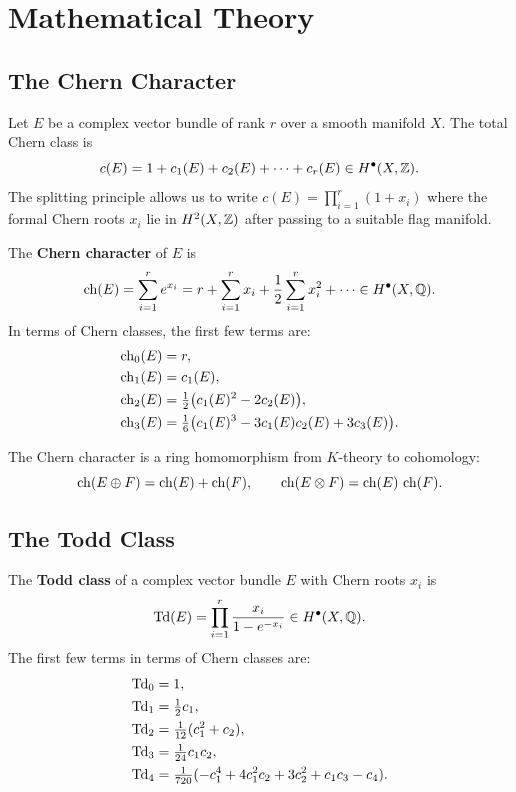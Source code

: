 \section{Mathematical Theory}

\subsection{The Chern Character}

Let \(E\) be a complex vector bundle of rank \(r\) over a smooth
manifold \(X\). The total Chern class is
\[
c(E) = 1 + c_1(E) + c_2(E) + \cdots + c_r(E)
\in H^{\bullet}(X, \mathbb{Z}).
\]
The splitting principle allows us to write
\(c(E) = \prod_{i=1}^r (1 + x_i)\) where the formal Chern roots \(x_i\)
lie in \(H^2(X, \mathbb{Z})\) after passing to a suitable flag manifold.

\begin{definition}
The \textbf{Chern character} of \(E\) is
\[
\operatorname{ch}(E) = \sum_{i=1}^r e^{x_i}
= r + \sum_{i=1}^r x_i + \frac12 \sum_{i=1}^r x_i^2 + \cdots
\in H^{\bullet}(X, \mathbb{Q}).
\]
In terms of Chern classes, the first few terms are:
\[
\begin{aligned}
\operatorname{ch}_0(E) &= r,\\
\operatorname{ch}_1(E) &= c_1(E),\\
\operatorname{ch}_2(E) &= \tfrac12\bigl(c_1(E)^2 - 2c_2(E)\bigr),\\
\operatorname{ch}_3(E) &= \tfrac16\bigl(c_1(E)^3 - 3c_1(E)c_2(E)
+ 3c_3(E)\bigr).
\end{aligned}
\]
\end{definition}

The Chern character is a ring homomorphism from \(K\)-theory to
cohomology:
\[
\operatorname{ch}(E \oplus F) = \operatorname{ch}(E) + \operatorname{ch}(F),\qquad
\operatorname{ch}(E \otimes F) = \operatorname{ch}(E)\,\operatorname{ch}(F).
\]

\subsection{The Todd Class}

\begin{definition}
The \textbf{Todd class} of a complex vector bundle \(E\) with Chern
roots \(x_i\) is
\[
\operatorname{Td}(E) = \prod_{i=1}^r \frac{x_i}{1 - e^{-x_i}}
\in H^{\bullet}(X, \mathbb{Q}).
\]
The first few terms in terms of Chern classes are:
\[
\begin{aligned}
\operatorname{Td}_0 &= 1,\\
\operatorname{Td}_1 &= \tfrac12 c_1,\\
\operatorname{Td}_2 &= \tfrac1{12}(c_1^2 + c_2),\\
\operatorname{Td}_3 &= \tfrac1{24} c_1 c_2,\\
\operatorname{Td}_4 &= \tfrac1{720}(-c_1^4 + 4c_1^2 c_2 + 3c_2^2
+ c_1 c_3 - c_4).
\end{aligned}
\]
\end{definition}

